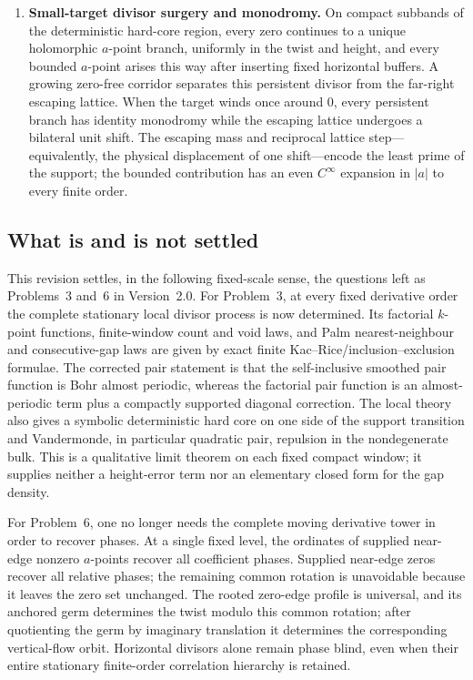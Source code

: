 \documentclass[11pt]{article}
\theoremstyle{definition}
\theoremstyle{remark}
\begin{document}
\begin{enumerate}[label=\textup{(\Roman*)},leftmargin=2.4em]
\item \textbf{Small-target divisor surgery and monodromy.}
On compact subbands of the deterministic hard-core region, every zero continues
to a unique holomorphic $a$-point branch, uniformly in the twist and height,
and every bounded $a$-point arises this way after inserting fixed horizontal
buffers.  A growing zero-free corridor separates this persistent divisor from
the far-right escaping lattice.  When the target winds once around $0$, every
persistent branch has identity monodromy while the escaping lattice undergoes
a bilateral unit shift.  The escaping mass and reciprocal lattice step---equivalently, the physical
displacement of one shift---encode the least prime of the support; the bounded contribution has an even
$C^\infty$ expansion in $|a|$ to every finite order.

\end{enumerate}

\subsection{What is and is not settled}

This revision settles, in the following fixed-scale sense, the questions left
as Problems~3 and~6 in Version~2.0.  For Problem~3, at every fixed derivative
order the complete stationary local divisor process is now determined.  Its
factorial $k$-point functions, finite-window count and void laws, and Palm
nearest-neighbour and consecutive-gap laws are given by exact finite
Kac--Rice/inclusion--exclusion formulae.  The corrected pair statement is that
the self-inclusive smoothed pair function is Bohr almost periodic, whereas the
factorial pair function is an almost-periodic term plus a compactly supported
diagonal correction.  The local theory also gives a symbolic deterministic
hard core on one side of the support transition and Vandermonde, in particular
quadratic pair, repulsion in the nondegenerate bulk.  This is a qualitative
limit theorem on each fixed compact window; it supplies neither a height-error
term nor an elementary closed form for the gap density.

For Problem~6, one no longer needs the complete moving derivative tower in
order to recover phases.  At a single fixed level, the ordinates of supplied
near-edge nonzero $a$-points recover all coefficient phases.  Supplied
near-edge zeros recover all relative phases; the remaining common rotation is
unavoidable because it leaves the zero set unchanged.  The rooted zero-edge
profile is universal, and its anchored germ determines the twist modulo this
common rotation; after quotienting the germ by imaginary translation it
determines the corresponding vertical-flow orbit.  Horizontal divisors alone
remain phase blind, even when their entire stationary finite-order correlation
hierarchy is retained.
\end{document}
